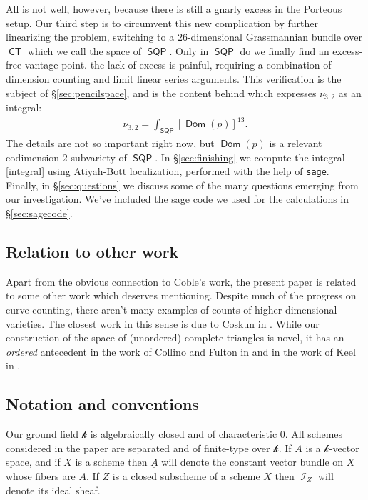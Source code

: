\documentclass{article}
\renewcommand{\k}{\mathscr{k}}
\DeclareMathOperator{\I}{\mathcal{I}}
\DeclareMathOperator{\CT}{\mathsf{CT}}
\DeclareMathOperator{\SQP}{\mathsf{SQP}}
\DeclareMathOperator{\Dom}{\mathsf{Dom}}
\begin{document}
All is not well, however, because there is still a gnarly excess in the Porteous setup.  Our third step is to circumvent this new complication by further linearizing the problem,  switching to a $26$-dimensional Grassmannian bundle over $\CT$ which we call the space of  $\SQP$.  Only in $\SQP$ do we finally find an excess-free vantage point.   the lack of excess is painful, requiring a combination of dimension counting and limit linear series arguments.  This  verification is the subject of \S \ref{sec:pencilspace}, and is the content behind  which expresses $\nu_{3,2}$ as an integral: 
\begin{align}
\label{integral}
\nu_{3,2} = \int_{\SQP} \left[\Dom(p) \right]^{13}.
\end{align}  The details are not so important right now, but $\Dom(p)$ is a relevant codimension $2$ subvariety of $\SQP$.   In \S \ref{sec:finishing} we compute the integral \eqref{integral} using Atiyah-Bott localization, performed with the help of \texttt{sage}. Finally, in \S \ref{sec:questions} we discuss some of the many questions emerging from our investigation. We've included the sage code we used for the calculations in \S \ref{sec:sagecode}. 



\subsection{Relation to other work} Apart from the obvious connection to Coble's work, the present paper is related to some other work which deserves mentioning.  Despite much of the progress on curve counting, there aren't many examples of counts of higher dimensional varieties.  The closest work in this sense is due to Coskun in \cite{coskun2006enumerative, coskun2006degenerations}.  While our construction of the space of (unordered) complete triangles is novel, it has an {\sl ordered} antecedent in the work of Collino and Fulton in \cite{collino1989intersection} and in the work of Keel in \cite{keel1993functorial}. 

\subsection{Notation and conventions}

Our ground field $\k$ is algebraically closed and of characteristic $0$.  All schemes considered in the paper are separated and of finite-type over $\k$.  If $A$ is a $\k$-vector space, and if $X$ is a scheme then $\underline{A}$ will denote the constant vector bundle on $X$ whose fibers are $A$. If $Z$ is a closed subscheme of a scheme $X$ then $\I_{Z}$ will denote its ideal sheaf.  
\end{document}
